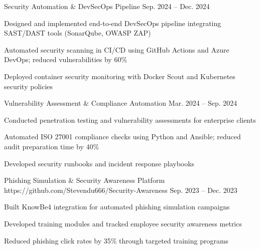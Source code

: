 
\begin{cventries}

  \cventry
    {Security Automation \& DevSecOps Pipeline} %
    {} %
    {} %
    {Sep. 2024 -- Dec. 2024} %
    {
      \begin{cvitems}
        \item {Designed and implemented end-to-end DevSecOps pipeline integrating SAST/DAST tools (SonarQube, OWASP ZAP)}
        \item {Automated security scanning in CI/CD using GitHub Actions and Azure DevOps; reduced vulnerabilities by 60\%}
        \item {Deployed container security monitoring with Docker Scout and Kubernetes security policies}
      \end{cvitems}
    }

  \cventry
    {Vulnerability Assessment \& Compliance Automation} %
    {} %
    {} %
    {Mar. 2024 -- Sep. 2024} %
    {
      \begin{cvitems}
        \item {Conducted penetration testing and vulnerability assessments for enterprise clients}
        \item {Automated ISO 27001 compliance checks using Python and Ansible; reduced audit preparation time by 40\%}
        \item {Developed security runbooks and incident response playbooks}
      \end{cvitems}
    }

  \cventry
    {Phishing Simulation \& Security Awareness Platform} %
    {https://github.com/Stevendu666/Security-Awareness} %
    {} %
    {Sep. 2023 -- Dec. 2023} %
    {
      \begin{cvitems}
        \item {Built KnowBe4 integration for automated phishing simulation campaigns}
        \item {Developed training modules and tracked employee security awareness metrics}
        \item {Reduced phishing click rates by 35\% through targeted training programs}
      \end{cvitems}
    }


\end{cventries}
